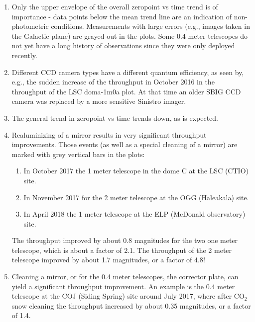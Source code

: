 \documentclass[]{spie}
\begin{document}
\begin{enumerate}

\item Only the upper envelope of the overall zeropoint vs time trend is of importance - data points
below the mean trend line are an indication of non-photometric conditions. Measurements with large
errors (e.g., images taken in the Galactic plane) are grayed out in the plots. Some 0.4 meter 
telescopes do not yet have a long history of observations since they were only deployed recently.

\item Different CCD camera types have a different quantum efficiency, as seen by, e.g., the sudden
increase of the throughput in October 2016 in the throughput of the LSC doma-1m0a plot. At that time
an older SBIG CCD camera was replaced by a more sensitive Sinistro imager.

\item The general trend in zeropoint vs time trends down, as is expected.

\item Realuminizing of a mirror results in very significant throughput improvements. Those events 
(as well as a special cleaning of a mirror) are marked with grey vertical bars in the plots:
 \begin{enumerate}
 	\item In October 2017 the 1 meter telescope in the dome C at the LSC (CTIO) site.
    \item In November 2017 for the 2 meter telescope at the OGG (Haleakala) site. 
    \item In April 2018 the 1 meter telescope at the ELP  (McDonald observatory) site.
\end{enumerate}
 The throughput improved by about 0.8 magnitudes for the two one meter telescope, which is about a 
 factor of 2.1. The throughput of the 2 meter telescope improved by about 1.7 magnitudes, or a 
 factor of 4.8!

\item Cleaning a mirror, or for the 0.4 meter telescopes, the  corrector plate, can yield
a significant throughput improvement. An example is the 0.4 meter telescope at the COJ (Siding 
Spring) site around July 2017, where after CO$_2$ snow cleaning the throughput increased by about 
0.35 magnitudes, or a factor of 1.4. 


\end{enumerate}
\end{document}
